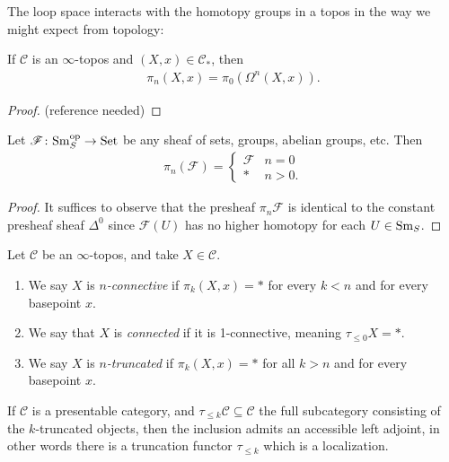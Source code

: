 \documentclass[11pt]{amsart}
\begin{document}
The loop space interacts with the homotopy groups in a topos in the way we might expect from topology:

\begin{proposition}\label{prop:pi-n-loops} 
If $\mathscr{C}$ is an $\infty$-topos and $(X,x) \in \mathscr{C}_\ast$, then
\begin{align*}
    \pi_n(X,x) = \pi_0 (\Omega^n (X,x)).
\end{align*}
\end{proposition}
\begin{proof} (reference needed)
\end{proof}




\begin{example} Let $\mathscr{F} \colon \mathrm{Sm}_S^{\mathrm{op}} \to \mathrm{Set}$ be any sheaf of sets, groups, abelian groups, etc. Then
\begin{align*}
    \pi_n(\mathscr{F}) = \begin{cases} \mathscr{F} & n=0 \\ \ast & n>0. \end{cases}
\end{align*}
\end{example}
\begin{proof} It suffices to observe that the presheaf $\pi_n \mathscr{F}$ is identical to the constant presheaf sheaf $\Delta^0$ since $\mathscr{F}(U)$ has no higher homotopy for each $U \in \mathrm{Sm}_S$.
\end{proof}


\begin{definition} \cite[6.5.1.10]{HTT} Let $\mathscr{C}$ be an $\infty$-topos, and take $X\in \mathscr{C}$.
\begin{enumerate}
    \item We say $X$ is $n$\textit{-connective} if $\pi_k(X,x) = \ast$ for every $k<n$ and for every basepoint $x$.

    \item We say that $X$ is \textit{connected} if it is 1-connective, meaning $\tau_{\le 0} X = \ast$.
    \item We say $X$ is $n$\textit{-truncated} if $\pi_k(X,x) = \ast$ for all $k>n$ and for every basepoint $x$.
\end{enumerate}
\end{definition}

\begin{proposition} \cite[5.5.6.18]{HTT}
If $\mathscr{C}$ is a presentable category, and $\tau_{\le k} \mathscr{C} \subseteq \mathscr{C}$ the full subcategory consisting of the $k$-truncated objects, then the inclusion admits an accessible left adjoint, in other words there is a truncation functor $\tau_{\le k}$ which is a localization.
\end{proposition}
\end{document}
